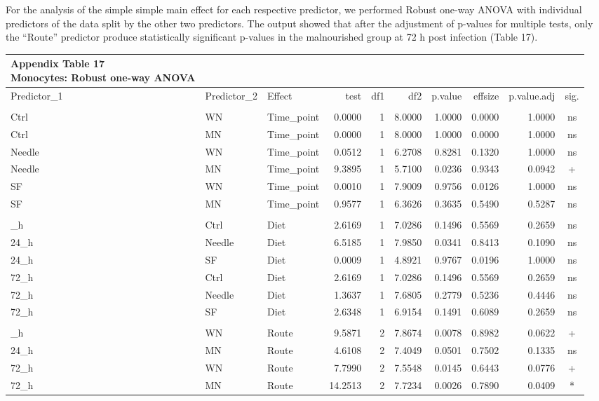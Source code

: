 \documentclass[
  12pt,
  letterpaper,
]{article}
\begin{document}
For the analysis of the simple simple main effect for each respective predictor, we performed Robust one-way ANOVA with individual predictors of the data split by the other two predictors. The output showed that after the adjustment of p-values for multiple tests, only the ``Route'' predictor produce statistically significant p-values in the malnourished group at 72 h post infection (Table 17).

\begin{longtable}{lllrrrrrrc}
\caption*{
{\large \textbf{Appendix Table 17}} \\ 
{\small \textbf{Monocytes: Robust one-way ANOVA}}
} \\ 
\toprule
Predictor\_1 & Predictor\_2 & Effect & test & df1 & df2 & p.value & effsize & p.value.adj & sig. \\ 
\midrule\addlinespace[2.5pt]
\multicolumn{10}{l}{Predictor: Time\_point} \\ 
\midrule\addlinespace[2.5pt]
Ctrl & WN & Time\_point & 0.0000 & 1 & 8.0000 & 1.0000 & 0.0000 & 1.0000 & ns \\ 
Ctrl & MN & Time\_point & 0.0000 & 1 & 8.0000 & 1.0000 & 0.0000 & 1.0000 & ns \\ 
Needle & WN & Time\_point & 0.0512 & 1 & 6.2708 & 0.8281 & 0.1320 & 1.0000 & ns \\ 
Needle & MN & Time\_point & 9.3895 & 1 & 5.7100 & 0.0236 & 0.9343 & 0.0942 & + \\ 
SF & WN & Time\_point & 0.0010 & 1 & 7.9009 & 0.9756 & 0.0126 & 1.0000 & ns \\ 
SF & MN & Time\_point & 0.9577 & 1 & 6.3626 & 0.3635 & 0.5490 & 0.5287 & ns \\ 
\midrule\addlinespace[2.5pt]
\multicolumn{10}{l}{Predictor: Diet} \\ 
\midrule\addlinespace[2.5pt]
24\_h & Ctrl & Diet & 2.6169 & 1 & 7.0286 & 0.1496 & 0.5569 & 0.2659 & ns \\ 
24\_h & Needle & Diet & 6.5185 & 1 & 7.9850 & 0.0341 & 0.8413 & 0.1090 & ns \\ 
24\_h & SF & Diet & 0.0009 & 1 & 4.8921 & 0.9767 & 0.0196 & 1.0000 & ns \\ 
72\_h & Ctrl & Diet & 2.6169 & 1 & 7.0286 & 0.1496 & 0.5569 & 0.2659 & ns \\ 
72\_h & Needle & Diet & 1.3637 & 1 & 7.6805 & 0.2779 & 0.5236 & 0.4446 & ns \\ 
72\_h & SF & Diet & 2.6348 & 1 & 6.9154 & 0.1491 & 0.6089 & 0.2659 & ns \\ 
\midrule\addlinespace[2.5pt]
\multicolumn{10}{l}{Predictor: Route} \\ 
\midrule\addlinespace[2.5pt]
24\_h & WN & Route & 9.5871 & 2 & 7.8674 & 0.0078 & 0.8982 & 0.0622 & + \\ 
24\_h & MN & Route & 4.6108 & 2 & 7.4049 & 0.0501 & 0.7502 & 0.1335 & ns \\ 
72\_h & WN & Route & 7.7990 & 2 & 7.5548 & 0.0145 & 0.6443 & 0.0776 & + \\ 
72\_h & MN & Route & 14.2513 & 2 & 7.7234 & 0.0026 & 0.7890 & 0.0409 & * \\ 
\bottomrule
\end{longtable}
\end{document}
